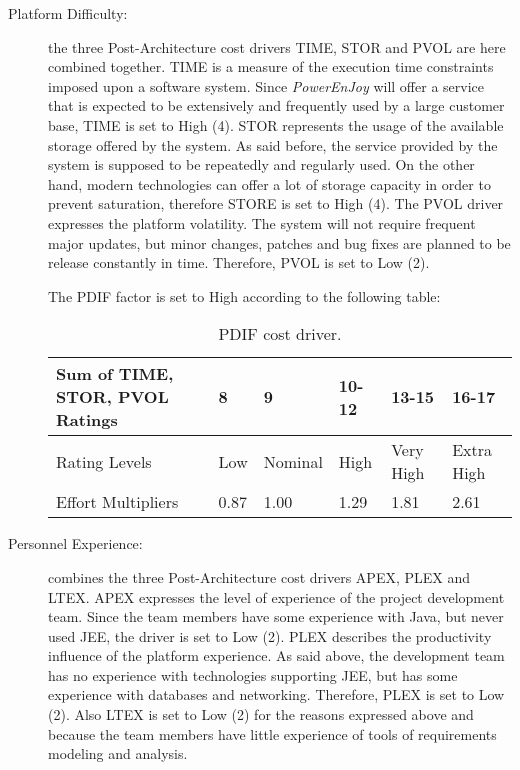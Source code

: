 \begin{description}
\item[Platform Difficulty:] the three Post-Architecture cost drivers TIME, STOR and PVOL are here combined together. TIME is a measure of the execution time constraints imposed upon a software system. Since \emph{PowerEnJoy} will offer a service that is expected to be extensively and frequently used by a large customer base, TIME is set to High (4). STOR represents the usage of the available storage offered by the system. As said before, the service provided by the system is supposed to be repeatedly and regularly used. On the other hand, modern technologies can offer a lot of storage capacity in order to prevent saturation, therefore STORE is set to High (4). The PVOL driver expresses the platform volatility. The system will not require frequent major updates, but minor changes, patches and bug fixes are planned to be release constantly in time. Therefore, PVOL is set to Low (2).

The PDIF factor is set to High according to the following table:

\begin{table}[H]
	\begin{adjustwidth}{-.5in}{-.5in}
    \centering
    \begin{tabular}{p{4cm}|p{1cm}|p{1.5cm}|p{1cm}|p{1cm}|p{1cm}}
        \hline
        Sum of TIME, STOR, PVOL Ratings & 8 & 9 & 10-12 & 13-15 & 16-17 \\
        \hline
        \hline
        Rating Levels & Low & Nominal & High & Very High & Extra High \\
        \hline
        Effort Multipliers & 0.87 & 1.00 & 1.29 & 1.81 & 2.61 \\
        \hline
    \end{tabular}
    \caption{PDIF cost driver.}
    \end{adjustwidth}
\end{table}

\item[Personnel Experience:] combines the three Post-Architecture cost drivers APEX, PLEX and LTEX. APEX expresses the level of experience of the project development team. Since the team members have some experience with Java, but never used JEE, the driver is set to Low (2). PLEX describes the productivity influence of the platform experience. As said above, the development team has no experience with technologies supporting JEE, but has some experience with databases and networking. Therefore, PLEX is set to Low (2). Also LTEX is set to Low (2) for the reasons expressed above and because the team members have little experience of tools of requirements modeling and analysis.


\end{description}
